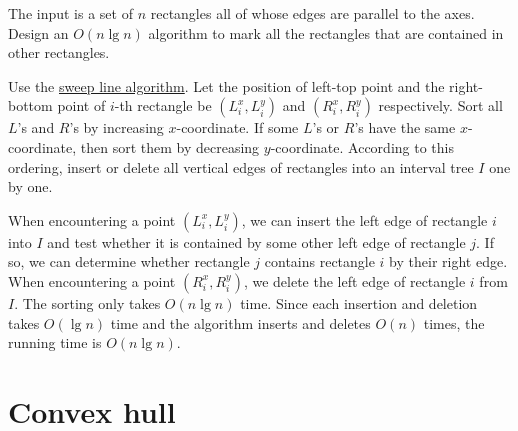 \begin{Exercise}[origin={NCTU CSIE 93}]
The input is a set of $n$ rectangles all of whose edges are parallel to the axes. Design an $O(n \lg n)$ algorithm to mark all the rectangles that are contained in other rectangles.
\end{Exercise}
\begin{Answer}
Use the \href{https://en.wikipedia.org/wiki/Sweep_line_algorithm}{sweep line algorithm}. Let the position of left-top point and the right-bottom point of $i$-th rectangle be $(L^x_i, L^y_ i)$ and $(R^x_i, R^y_i)$ respectively. Sort all $L$'s and $R$'s by increasing $x$-coordinate. If some $L$'s or $R$'s have the same $x$-coordinate, then sort them by decreasing $y$-coordinate. According to this ordering, insert or delete all vertical edges of rectangles into an interval tree $I$ one by one. 

When encountering a point $(L^x_i, L^y_ i)$, we can insert the left edge of rectangle $i$ into $I$ and test whether it is contained by some other left edge of rectangle $j$. If so, we can determine whether rectangle $j$ contains rectangle $i$ by their right edge. When encountering a point $(R^x_i, R^y_i)$, we delete the left edge of rectangle $i$ from $I$. The sorting only takes $O(n \lg n)$ time. Since each insertion and deletion takes $O(\lg n)$ time and the algorithm inserts and deletes $O(n)$ times, the running time is $O(n \lg n)$.
\end{Answer}


\section{Convex hull}

